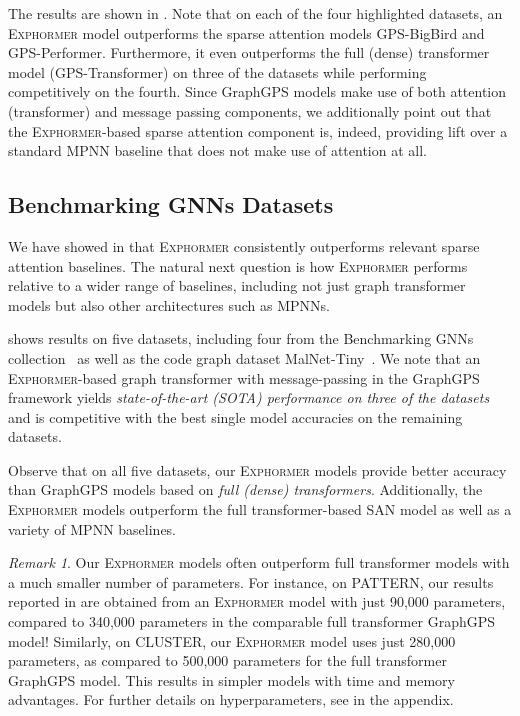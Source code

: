 \documentclass{article}
\theoremstyle{plain}
\theoremstyle{definition}
\theoremstyle{remark}
\newtheorem{remark}[theorem]{Remark}
\begin{document}
The results are shown in . Note that on each of the four highlighted datasets, an \textsc{Exphormer} model outperforms the sparse attention models GPS-BigBird and GPS-Performer. Furthermore, it even outperforms the full (dense) transformer model (GPS-Transformer) on three of the datasets while performing competitively on the fourth. Since GraphGPS models make use of both attention (transformer) and message passing components, we additionally point out that the \textsc{Exphormer}-based sparse attention component is, indeed, providing lift over a standard MPNN baseline that does not make use of attention at all.



\subsection{Benchmarking GNNs Datasets} \label{sec:baselines}
We have showed in  that \textsc{Exphormer} consistently outperforms relevant sparse attention baselines. The natural next question is how \textsc{Exphormer} performs relative to a wider range of baselines, including not just graph transformer models but also other architectures such as MPNNs.

 shows results on five datasets, including four from the Benchmarking GNNs collection~\citep{DwivediJLBB20} as well as the code graph dataset MalNet-Tiny~\citep{FreitasDNC21}.  We note that an \textsc{Exphormer}-based graph transformer with message-passing in the GraphGPS framework yields \emph{state-of-the-art (SOTA) performance on three of the datasets} and is competitive with the best single model accuracies on the remaining datasets.


Observe that on all five datasets, our \textsc{Exphormer} models provide better accuracy than GraphGPS models based on \emph{full (dense) transformers}. Additionally, the \textsc{Exphormer} models outperform the full transformer-based SAN model as well as a variety of MPNN baselines. 


\begin{remark}
Our \textsc{Exphormer} models often outperform full transformer models with a much smaller number of parameters. For instance, on PATTERN, our results reported in  are obtained from an \textsc{Exphormer} model with just 90,000 parameters, compared to 340,000 parameters in the comparable full transformer GraphGPS model! Similarly, on CLUSTER, our \textsc{Exphormer} model uses just 280,000 parameters, as compared to 500,000 parameters for the full transformer GraphGPS model. This results in simpler models with time and memory advantages. For further details on hyperparameters, see  in the appendix.
\end{remark}
\end{document}
